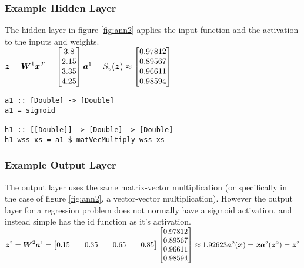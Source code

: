 \documentclass[a4paper]{article}
\begin{document}
\subsubsection{Example Hidden Layer}
The hidden layer in figure \ref{fig:ann2} applies the input function and the
activation to the inputs and weights. \\
$ \boldsymbol{z} = \boldsymbol{W}^1 \boldsymbol{x}^T = 
\begin{bmatrix}
   3.8 \\
   2.15 \\
   3.35 \\
   4.25
  \end{bmatrix} \\
\boldsymbol{a}^1 = S_v(\boldsymbol{z}) \approx \begin{bmatrix}
   0.97812 \\
   0.89567 \\
   0.96611 \\
   0.98594
   \end{bmatrix}$
\begin{verbatim}
a1 :: [Double] -> [Double]
a1 = sigmoid

h1 :: [[Double]] -> [Double] -> [Double]
h1 wss xs = a1 $ matVecMultiply wss xs
\end{verbatim}

\subsubsection{Example Output Layer}
The output layer uses the same matrix-vector multiplication (or specifically in
the case of figure \ref{fig:ann2}, a vector-vector multiplication). However the
output layer for a regression problem does not normally have a sigmoid
activation, and instead simple has the id function as it's activation. \\
$\boldsymbol{z}^2 = \boldsymbol{W}^2 \boldsymbol{a}^1 = 
\begin{bmatrix}
   0.15 && 0.35 && 0.65 && 0.85
\end{bmatrix}
\begin{bmatrix}
 0.97812 \\
   0.89567 \\
   0.96611 \\
   0.98594
\end{bmatrix} \approx 1.92623 \\
\boldsymbol{a}^2(\boldsymbol{x}) = \boldsymbol{x} \\
\boldsymbol{a}^2(\boldsymbol{z}^2) = \boldsymbol{z}^2$
\end{document}
